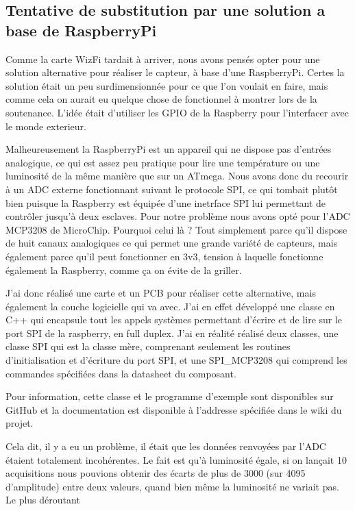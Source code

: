 	\subsection{Tentative de substitution par une solution a base de RaspberryPi}
		Comme la carte WizFi tardait à arriver, nous avons pensés opter pour une solution alternative
		pour réaliser le capteur, à base d'une RaspberryPi. Certes la solution était un peu surdimensionnée
		pour ce que l'on voulait en faire, mais comme cela on aurait eu quelque chose de fonctionnel
		à montrer lors de la soutenance. L'idée était d'utiliser les GPIO de la Raspberry pour
		l'interfacer avec le monde exterieur.
		\par
		Malheureusement la RaspberryPi est un appareil qui ne dispose pas d'entrées analogique,
		ce qui est assez peu pratique pour lire une température ou une luminosité de la même manière que
		sur un ATmega. Nous avons donc du recourir à un ADC externe fonctionnant suivant le protocole SPI,
		ce qui tombait plutôt bien puisque la Raspberry est équipée d'une inetrface SPI lui permettant
		de contrôler jusqu'à deux esclaves. Pour notre problème nous avons opté pour l'ADC MCP3208 de
		MicroChip. Pourquoi celui là ? Tout simplement parce qu'il dispose de huit canaux analogiques ce qui
		permet une grande variété de capteurs, mais également parce qu'il peut fonctionner en 3v3, tension à
		laquelle fonctionne également la Raspberry, comme ça on évite de la griller.
		\par
		J'ai donc réalisé une carte et un PCB pour réaliser cette alternative, mais également
		la couche logicielle qui va avec. J'ai en effet développé une classe en C++ qui
		encapsule tout les appels systèmes permettant d'écrire et de lire sur le port SPI
		de la raspberry, en full duplex. J'ai en réalité réalisé deux classes, une classe
		SPI qui est la classe mère, comprenant seulement les routines d'initialisation et d'écriture
		du port SPI, et une SPI\_MCP3208 qui comprend les commandes spécifiées dans la datasheet
		du composant.
		\par
		Pour information, cette classe et le programme d'exemple sont disponibles sur GitHub et la
		documentation est disponible à l'addresse spécifiée dans le wiki du projet.
		\par
		Cela dit, il y a eu un problème, il était que les données renvoyées par l'ADC étaient
		totalement incohérentes. Le fait est qu'à luminosité égale, si on lançait 10 acquisitions
		nous pouvions obtenir des écarts de plus de 3000 (sur 4095 d'amplitude) entre
		deux valeurs, quand bien même la luminosité ne variait pas. Le plus déroutant

